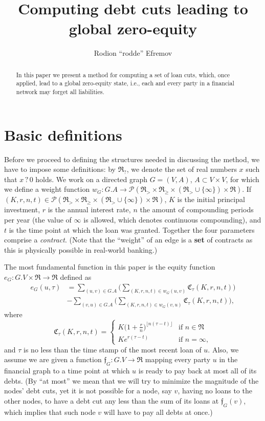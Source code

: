 \documentclass[10pt]{article}
\title{Computing debt cuts leading to global zero-equity}
\author{Rodion ``rodde'' Efremov}
\newcommand{\RR}{\mathfrak{R}}
\newcommand{\CC}{\mathfrak{C}}
\newcommand{\ff}{\mathfrak{f}}
\begin{document}
  \maketitle
  
  \begin{abstract}
  In this paper we present a method for computing a set of loan cuts, which, once applied, lead to a global zero-equity state, i.e., each and every party in a financial network may forget all liabilities. 
  \end{abstract}
  
  \section{Basic definitions}
  Before we proceed to defining the structures needed in discussing the method, we have to impose some definitions: by $\RR_?$, we denote the set of real numbers $x$ such that $x \, ? \, 0$ holds. We work on a directed graph $G=(V,A)$, $A \subset V \times V$, for which we define a weight function $w_G \colon G.A \to \mathcal{P}(\RR_> \times \RR_{\geq} \times (\RR_> \cup \{\infty\}) \times \RR)$. If $(K, r, n, t) \in \mathcal{P}(\RR_> \times \RR_{\geq} \times (\RR_> \cup \{\infty\}) \times \RR)$, $K$ is the initial principal investment, $r$ is the annual interest rate, $n$ the amount of compounding periods per year (the value of $\infty$ is allowed, which denotes continuous compounding), and $t$ is the time point at which the loan was granted. Together the four parameters comprise a \textit{contract}. (Note that the ``weight'' of an edge is a \textbf{set} of contracts as this is physically possible in real-world banking.) 

The most fundamental function in this paper is the equity function $e_G \colon G.V \times \RR \to \RR$ defined as 
\begin{align*}
e_G(u, \tau) &= \sum_{(u, v) \in G.A} \Bigg( \sum_{(K, r, n, t) \in w_G(u, v)} \CC_{\tau}(K, r, n, t) \Bigg) \\
&- \sum_{(v, u) \in G.A} \Bigg( \sum_{(K, r, n, t) \in w_G(v,u)} \CC_{\tau}(K, r, n, t) \Bigg),
\end{align*}
where 
\[
\CC_{\tau}(K, r, n, t) = 
\begin{cases}
K\big( 1 + \frac{r}{n}\big)^{\lfloor n(\tau - t) \rfloor} & \mbox{if } n \in \mathfrak{N} \\
Ke^{r(\tau - t)} & \mbox{if } n = \infty,
\end{cases}
\]
and $\tau$ is no less than the time stamp of the most recent loan of $u$. Also, we assume we are given a function $\ff_G \colon G.V \to \RR$ mapping every party $u$ in the financial graph to a time point at which $u$ is ready to pay back at most all of its debts. (By ``at most'' we mean that we will try to minimize the magnitude of the nodes' debt cuts, yet it is not possible for a node, say $v$, having no loans to the other nodes, to have a debt cut any less than the sum of its loans at $\ff_G(v)$, which implies that such node $v$ will have to pay all debts at once.)
\end{document}
